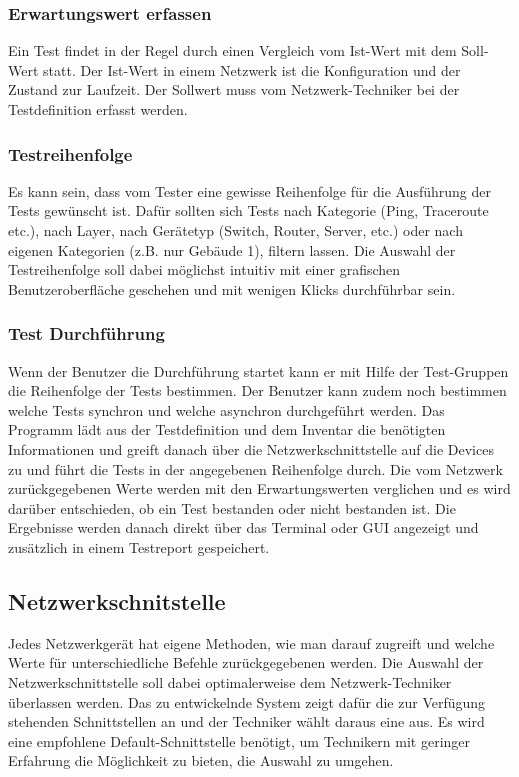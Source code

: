 \documentclass[
	ngerman,
	toc=listof, %
	toc=bibliography, %
	footnotes=multiple, %
	parskip=half, %
	numbers=noendperiod %
]{scrartcl}
\begin{document}
		\subsubsection{Erwartungswert erfassen}
			Ein Test findet in der Regel durch einen Vergleich vom Ist-Wert mit dem Soll-Wert statt. Der Ist-Wert in einem Netzwerk ist die Konfiguration und der Zustand zur Laufzeit. Der Sollwert muss vom Netzwerk-Techniker bei der Testdefinition erfasst werden.
			

		\subsubsection{Testreihenfolge}
			Es kann sein, dass vom Tester eine gewisse Reihenfolge für die Ausführung der Tests gewünscht ist. 
			Dafür sollten sich Tests nach Kategorie (Ping, Traceroute etc.), nach Layer, nach Gerätetyp (Switch, Router, Server, etc.) oder nach eigenen Kategorien (z.B. nur Gebäude 1), filtern lassen. 
			Die Auswahl der Testreihenfolge soll dabei möglichst intuitiv mit einer grafischen Benutzeroberfläche geschehen und mit wenigen Klicks durchführbar sein.

		\subsubsection{Test Durchführung}
			Wenn der Benutzer die Durchführung startet kann er mit Hilfe der Test-Gruppen die Reihenfolge der Tests bestimmen. 
			Der Benutzer kann zudem noch bestimmen welche Tests synchron und welche asynchron durchgeführt werden.
			Das Programm lädt aus der Testdefinition und dem Inventar die benötigten Informationen und greift danach über die Netzwerkschnittstelle auf die Devices zu und führt die Tests in der angegebenen Reihenfolge durch.
			Die vom Netzwerk zurückgegebenen Werte werden mit den Erwartungswerten verglichen und es wird darüber entschieden, ob ein Test bestanden oder nicht bestanden ist.
			Die Ergebnisse werden danach direkt über das Terminal oder GUI angezeigt und zusätzlich in einem Testreport gespeichert.
			\newpage

	\subsection{Netzwerkschnitstelle}
		Jedes Netzwerkgerät hat eigene Methoden, wie man darauf zugreift und welche Werte für unterschiedliche Befehle zurückgegebenen werden.
		Die Auswahl der Netzwerkschnittstelle soll dabei optimalerweise dem Netzwerk-Techniker überlassen werden.
		Das zu entwickelnde System zeigt dafür die zur Verfügung stehenden Schnittstellen an und der Techniker wählt daraus eine aus. 
		Es wird eine empfohlene Default-Schnittstelle benötigt, um Technikern mit geringer Erfahrung die Möglichkeit zu bieten, die Auswahl zu umgehen.
\end{document}
